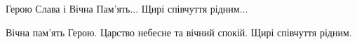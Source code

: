  
 
 
 
 
\qqSecCmt

\begin{itemize} %
Герою Слава і Вічна Пам'ять...
Щирі співчуття рідним...

Вічна пам'ять Герою. Царство небесне та вічний спокій. Щирі співчуття рідним.
\end{itemize} %

